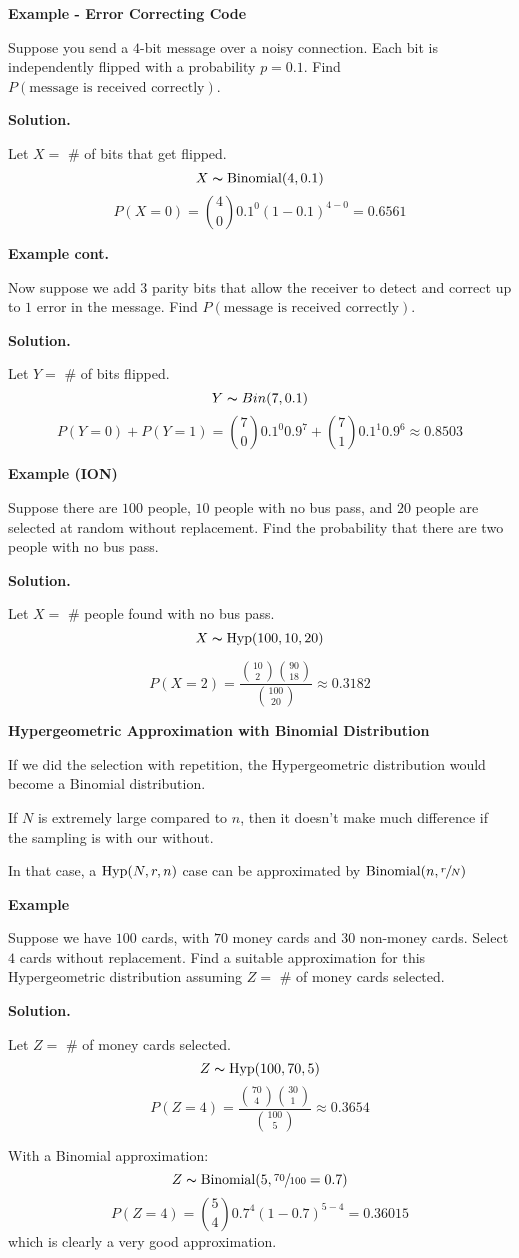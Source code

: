 \textbf{Example - Error Correcting Code}

Suppose you send a $ 4 $-bit message over a noisy connection.
Each bit is independently flipped with a probability $ p=0.1 $. Find
$ P(\text{message is received correctly}) $.

\textbf{Solution.}

Let $ X= $ \# of bits that get flipped.
\[ X \thicksim \operatorname{Binomial}(4,0.1) \]
\[ P(X=0)=\binom{4}{0}0.1^0(1-0.1)^{4-0}=0.6561 \]

\textbf{Example cont.}

Now suppose we add $ 3 $ parity bits that allow the receiver
to detect and correct up to $ 1 $ error in the message. Find
$ P(\text{message is received correctly}) $.

\textbf{Solution.}

Let $ Y= $ \# of bits flipped.
\[ Y \thicksim Bin(7,0.1) \]
\[P(Y=0)+P(Y=1)= \binom{7}{0}0.1^0 0.9^7 + \binom{7}{1}0.1^1 0.9^6\approx 0.8503 \]

\textbf{Example (ION)}

Suppose there are $ 100 $ people, $ 10 $ people with no bus pass,
and $ 20 $ people are selected at random without replacement.
Find the probability that there are two people with no bus pass.

\textbf{Solution.}

Let $ X= $ \# people found with no bus pass.
\[ X \thicksim \operatorname{Hyp}(100,10,20) \]

\[ P(X=2)=\frac{\binom{10}{2}\binom{90}{18}}{\binom{100}{20}}\approx 0.3182 \]

\textbf{Hypergeometric Approximation with Binomial Distribution}

If we did the selection with repetition, the Hypergeometric distribution
would become a Binomial distribution.

If $ N $ is extremely large compared to $ n $, then it doesn't make much difference
if the sampling is with our without.

In that case, a $ \operatorname{Hyp}(N,r,n) $ case can be approximated by $ \operatorname{Binomial}(n,\sfrac{r}{N}) $

\textbf{Example}

Suppose we have $ 100 $ cards, with $ 70 $ money cards and $ 30 $ non-money cards.
Select $ 4 $ cards without replacement.
Find a suitable approximation for this Hypergeometric distribution assuming
$ Z= $ \# of money cards selected.

\textbf{Solution.}

Let $ Z= $ \# of money cards selected.
\[ Z \thicksim \operatorname{Hyp}(100,70,5) \]
\[ P(Z=4)=\frac{\binom{70}{4}\binom{30}{1}}{\binom{100}{5}}\approx 0.3654 \]

With a Binomial approximation:
\[ Z \thicksim \operatorname{Binomial}(5,\sfrac{70}{100}=0.7) \]
\[ P(Z=4)=\binom{5}{4}0.7^4(1-0.7)^{5-4}= 0.36015 \]
which is clearly a very good approximation.
